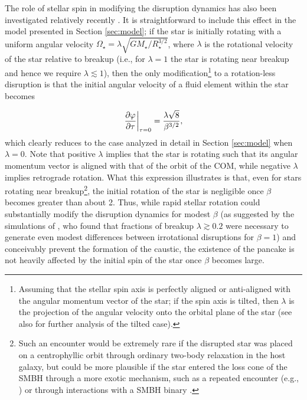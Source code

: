 \documentclass[twocolumn]{aastex62}
\begin{document}
The role of stellar spin in modifying the disruption dynamics has also been investigated relatively recently \citep{golightly19b, kagaya19, sacchi19}. It is straightforward to include this effect in the model presented in Section \ref{sec:model}; if the star is initially rotating with a uniform angular velocity $\Omega_{\star} = \lambda\sqrt{GM_{\star}/R_{\star}^{3/2}}$, where $\lambda$ is the rotational velocity of the star relative to breakup (i.e., for $\lambda = 1$ the star is rotating near breakup and hence we require $\lambda \lesssim 1$), then the only modification\footnote{Assuming that the stellar spin axis is perfectly aligned or anti-aligned with the angular momentum vector of the star; if the spin axis is tilted, then $\lambda$ is the projection of the angular velocity onto the orbital plane of the star (see also \citealt{golightly19b} for further analysis of the tilted case).} to a rotation-less disruption is that the initial angular velocity of a fluid element within the star becomes 

\begin{equation}
\frac{\partial\varphi}{\partial \tau}\bigg{|}_{\tau = 0} = \frac{\lambda\sqrt{8}}{\beta^{3/2}},
\end{equation}
which clearly reduces to the case analyzed in detail in Section \ref{sec:model} when $\lambda = 0$. Note that positive $\lambda$ implies that the star is rotating such that its angular momentum vector is aligned with that of the orbit of the COM, while negative $\lambda$ implies retrograde rotation. What this expression illustrates is that, even for stars rotating near breakup\footnote{Such an encounter would be extremely rare if the disrupted star was placed on a centrophyllic orbit through ordinary two-body relaxation in the host galaxy, but could be more plausible if the star entered the loss cone of the SMBH through a more exotic mechanism, such as a repeated encounter (e.g., \citealt{sacchi19}) or through interactions with a SMBH binary \citep{coughlin17}.}, the initial rotation of the star is negligible once $\beta$ becomes greater than about 2. Thus, while rapid stellar rotation could substantially modify the disruption dynamics for modest $\beta$ (as suggested by the simulations of \citealt{golightly19a}, who found that fractions of breakup $\lambda \gtrsim 0.2$ were necessary to generate even modest differences between irrotational disruptions for $\beta = 1$) and conceivably prevent the formation of the caustic, the existence of the pancake is not heavily affected by the initial spin of the star once $\beta$ becomes large. 
\end{document}
